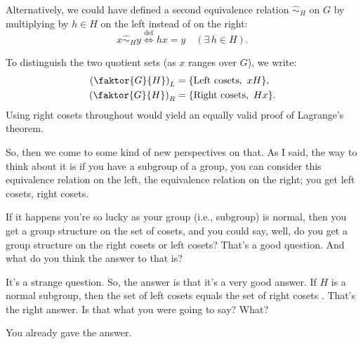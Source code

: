 \begin{content}
Alternatively, we could have defined a second equivalence relation $\hat{\sim}_H$ on $G$ by multiplying by $h \in H$ on the left instead of on the right:
\[
x \hat{\sim}_H y \stackrel{\text{def}}{\iff} hx = y \quad (\exists\, h \in H).
\]


To distinguish the two quotient sets (as $x$ ranges over $G$), we write:
\begin{align*}
\left(\faktor{G}{H}\right)_L &= \{ \text{Left cosets},\ xH \}, \\
\left(\faktor{G}{H}\right)_R &= \{ \text{Right cosets},\ Hx \}.
\end{align*}
Using right cosets throughout would yield an equally valid proof of Lagrange's theorem.
\end{content}

\begin{speech}[00:05:36 - 00:06:39]
So, then we come to some kind of new perspectives on that. As I said, the way to think about it is if you have a subgroup of a group, you can consider this equivalence relation on the left, the equivalence relation on the right; you get left cosets, right cosets.

If it happens you're so lucky as your group (i.e., subgroup) is normal, then you get a group structure on the set of cosets, and you could say, well, do you get a group structure on the right cosets or left cosets? That's a good question. And what do you think the answer to that is?

It's a strange question. So, the answer is that it's a very good answer. If $H$ is a normal subgroup, then the set of left cosets equals the set of right cosets . That's the right answer. Is that what you were going to say?  What?
\end{speech}

\begin{student}
You already gave the answer.
\end{student}

